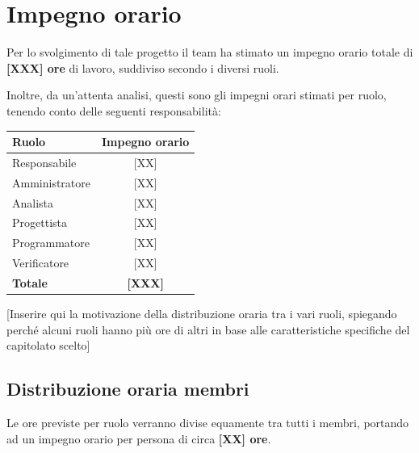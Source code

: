 \documentclass[a4paper,12pt]{article}
\begin{document}
\newpage

\section{Impegno orario}

Per lo svolgimento di tale progetto il team ha stimato un impegno orario totale di \textbf{[XXX] ore} di lavoro, suddiviso secondo i diversi ruoli.

Inoltre, da un'attenta analisi, questi sono gli impegni orari stimati per ruolo, tenendo conto delle seguenti responsabilità:

\vspace{0.5cm}

\begin{center}
\begin{tcolorbox}[colback=secondaryblue!5,colframe=secondaryblue,width=0.7\textwidth,arc=2mm,boxrule=0.5pt]
\begin{center}
\begin{tabular}{lc}
\toprule
\textbf{Ruolo} & \textbf{Impegno orario} \\
\midrule
Responsabile & {[XX]} \\
Amministratore & {[XX]} \\
Analista & {[XX]} \\
Progettista & {[XX]} \\
Programmatore & {[XX]} \\
Verificatore & {[XX]} \\
\midrule
\textbf{Totale} & \textbf{[XXX]} \\
\bottomrule
\end{tabular}
\end{center}
\end{tcolorbox}
\end{center}

\vspace{0.5cm}

[Inserire qui la motivazione della distribuzione oraria tra i vari ruoli, spiegando perché alcuni ruoli hanno più ore di altri in base alle caratteristiche specifiche del capitolato scelto]

\subsection{Distribuzione oraria membri}

Le ore previste per ruolo verranno divise equamente tra tutti i membri, portando ad un impegno orario per persona di circa \textbf{[XX] ore}.
\end{document}
